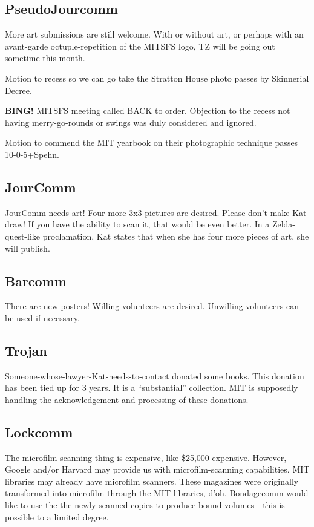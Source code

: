 \documentclass[10pt]{article}
\newcommand{\bing}{{\bf BING!} }
\begin{document}
\subsection*{PseudoJourcomm}
More art submissions are still welcome. With or without art, or perhaps with an avant-garde octuple-repetition of the MITSFS logo, TZ will be going out sometime this month.  

Motion to recess so we can go take the Stratton House photo passes by Skinnerial Decree.

\bing
MITSFS meeting called BACK to order.
Objection to the recess not having merry-go-rounds or swings was duly considered and ignored.

Motion to commend the MIT yearbook on their photographic technique passes 10-0-5+Spehn.

\subsection*{JourComm}
JourComm needs art! Four more 3x3 pictures are desired. Please don't make Kat draw! If you have the ability to scan it, that would be even better. In a Zelda-quest-like proclamation, Kat states that when she has four more pieces of art, she will publish.

\subsection*{Barcomm}
There are new posters! Willing volunteers are desired. Unwilling volunteers can be used if necessary.

\subsection*{Trojan}
Someone-whose-lawyer-Kat-needs-to-contact donated some books. This donation has been tied up for 3 years. It is a ``substantial'' collection. MIT is supposedly handling the acknowledgement and processing of these donations.

\subsection*{Lockcomm}
The microfilm scanning thing is expensive, like \$25,000 expensive. However, Google and/or Harvard may provide us with microfilm-scanning capabilities. MIT libraries may already have microfilm scanners. These magazines were originally transformed into microfilm through the MIT libraries, d'oh. Bondagecomm would like to use the the newly scanned copies to produce bound volumes - this is possible to a limited degree.
\end{document}
